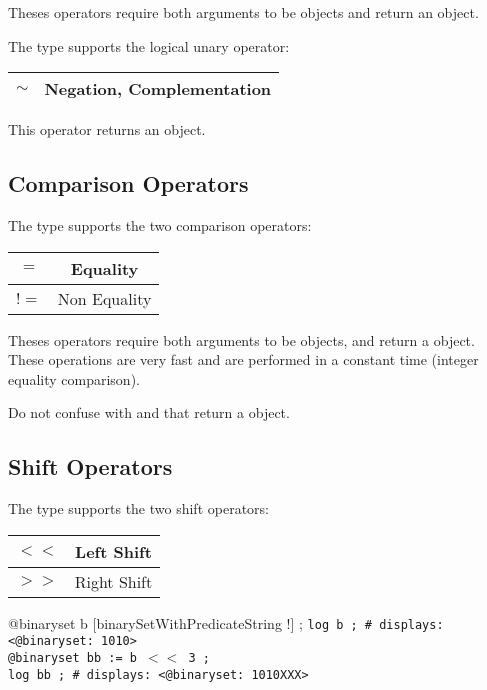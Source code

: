 Theses operators require both arguments to be  objects and return an  object.\newline


The  type supports the logical unary operator:\newline

\begin{tabular}{|c|c|}
\hline
$\sim$ & Negation, Complementation \\
\hline
\end{tabular}

This operator returns an  object.







\subsection{Comparison Operators}

The  type supports the two comparison operators:\newline

\begin{tabular}{|c|c|}
\hline
$=$ & Equality \\
\hline
$!=$ & Non Equality \\
\hline
\end{tabular}

Theses operators require both arguments to be  objects, and return a  object. These operations are very fast and are performed in a constant time (integer equality comparison).

Do not confuse with  and  that return a  object.







\subsection{Shift Operators}

The  type supports the two shift operators:\newline

\begin{tabular}{|c|c|}
\hline
$<<$ & Left Shift \\
\hline
$>>$ & Right Shift \\
\hline
\end{tabular}

\exempleUneLigne
{}
{@binaryset b [binarySetWithPredicateString !\textquotedbl] ;}
\texttt{log b ; \# displays: <@binaryset:~1010>}\\
\texttt{@binaryset bb := b $<<$ 3 ;}\\
\texttt{log bb ; \# displays: <@binaryset:~1010XXX>}\\

